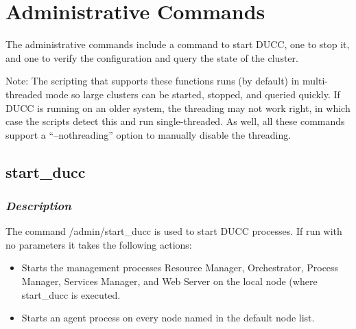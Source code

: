 % 
% 
% 
% 

\section{Administrative Commands}

   The administrative commands include a command to start DUCC, one to stop it, and one to 
   verify the configuration and query the state of the cluster.

   Note: The scripting that supports these functions runs (by default) in multi-threaded mode so
   large clusters can be started, stopped, and queried quickly.  If DUCC is running on an older
   system, the threading may not work right, in which case the scripts detect this and run
   single-threaded.  As well, all these commands support a ``--nothreading'' option to manually
   disable the threading.

\subsection{start\_ducc}
\label{subsec:admin.start-ducc}

    \subsubsection{{\em Description}}
    The command \ducchome/admin/start\_ducc is used to start DUCC processes. If run with no parameters
    it takes the following actions:
    \begin{itemize}
      \item Starts the management processes Resource Manager, Orchestrator, Process Manager,      
      Services Manager, and Web Server on the local node (where start\_ducc is executed.       
      \item Starts an agent process on every node named in the default node list. 
    \end{itemize}


